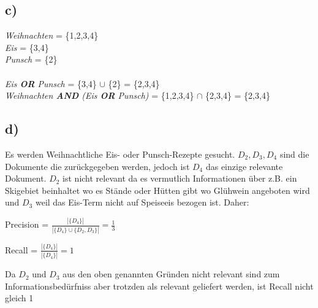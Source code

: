\documentclass[11pt,a4paper,parskip=half ]{scrartcl}
\begin{document}
	\subsection*{c)}
		\textit{Weihnachten}	= \{1,2,3,4\} 	\\
		\textit{Eis}	= \{3,4\}	\\
		\textit{Punsch}	= \{2\}	\\	~\\
		\textit{Eis \textbf{OR} Punsch}	= \{3,4\} $\cup$ \{2\} = \{2,3,4\}	\\
		\textit{Weihnachten \textbf{AND} (Eis \textbf{OR} Punsch)}	= \{1,2,3,4\} $\cap$ \{2,3,4\} = \{2,3,4\}	\\
		
	\subsection*{d)} Es werden Weihnachtliche Eis- oder Punsch-Rezepte gesucht. $D_{2},D_{3},D_{4}$ sind die Dokumente die zurückgegeben werden, jedoch ist $D_{4}$ das einzige relevante Dokument. $D_{2}$ ist nicht relevant da es vermutlich Informationen über z.B. ein Skigebiet beinhaltet wo es Stände oder Hütten gibt wo Glühwein angeboten wird und $D_{3}$ weil das Eis-Term nicht auf Speiseeis bezogen ist. Daher:
	
	Precision = $\frac{|\{D_{4}\}|}{|\{D_{4}\}\cup\{D_{2},D_{3}\}|} = \frac{1}{3}$
	
	Recall = $\frac{|\{D_{4}\}|}{|\{D_{4}\}|} = 1$
	
	Da $D_{2}$ und $D_{3}$ aus den oben genannten Gründen nicht relevant sind zum Informationsbedürfniss aber trotzden als relevant geliefert werden, ist Recall nicht gleich 1
	

	
	
	
\end{document}
